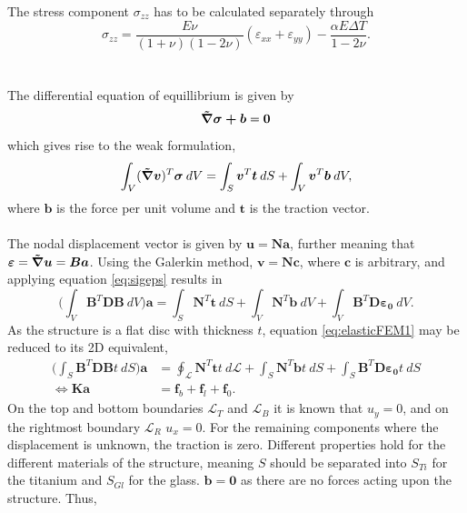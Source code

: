 \documentclass[a4paper,11pt]{article}
\begin{document}
The stress component $\sigma_{zz}$ has to be calculated separately through
\begin{equation} \label{eq:sigmazz}
    \sigma_{zz}=\frac{E \nu}{(1+\nu)(1-2\nu)}(\varepsilon_{xx}+ \varepsilon_{yy}) - \frac{\alpha E \Delta T}{1-2\nu}.
\end{equation}
\\
\\The differential equation of equillibrium is given by
\begin{equation}
    \boldsymbol{\Tilde{\nabla}\sigma + b} = \boldsymbol 0
\end{equation}
which gives rise to the weak formulation,
\begin{equation}
    \int_V (\boldsymbol{\Tilde{\nabla}v})^T \boldsymbol{\sigma} \: dV = \int_S \boldsymbol{v}^T\boldsymbol{t} \: dS + \int_V \boldsymbol{v}^T\boldsymbol{b} \: dV,
\end{equation}
where $\boldsymbol{b}$ is the force per unit volume and $\boldsymbol{t}$ is the traction vector.\\
\\The nodal displacement vector is given by $\boldsymbol{u} = \boldsymbol{Na}$, further meaning that $\boldsymbol{\varepsilon} = \boldsymbol{\Tilde{\nabla} u} = \boldsymbol{Ba}$. Using the Galerkin method, $\boldsymbol{v} = \boldsymbol{Nc}$, where $\boldsymbol{c}$ is arbitrary, and applying equation \ref{eq:sigeps} results in
\begin{equation} \label{eq:elasticFEM1}
    \bigg( \int_V \boldsymbol{B}^T\boldsymbol{DB} \: dV \bigg) \boldsymbol{a} = \int_S \boldsymbol{N}^T \boldsymbol{t} \: dS + \int_V \boldsymbol{N}^T \boldsymbol{b} \: dV + \int_V \boldsymbol{B}^T \boldsymbol{D \varepsilon_0} \: dV.
\end{equation}
As the structure is a flat disc with thickness $t$, equation \ref{eq:elasticFEM1} may be reduced to its 2D equivalent,
\begin{align}
    \bigg( \int_S \boldsymbol{B}^T\boldsymbol{DB} t \: dS \bigg) \boldsymbol{a} &= \oint_{\mathcal{L}} \boldsymbol{N}^T \boldsymbol{t} t \: d\mathcal{L} + \int_S \boldsymbol{N}^T \boldsymbol{b} t \: dS + \int_S \boldsymbol{B}^T \boldsymbol{D \varepsilon_0} t \: dS\\
    \iff \boldsymbol{Ka} &= \boldsymbol{f}_b + \boldsymbol{f}_l + \boldsymbol{f}_0. \label{eq:mechanicalFEM}
\end{align}
On the top and bottom boundaries $\mathcal{L}_T$ and $\mathcal{L}_B$ it is known that $u_y = 0$, and on the rightmost boundary $\mathcal{L}_R$ $u_x=0$. For the remaining components where the displacement is unknown, the traction is zero. Different properties hold for the different materials of the structure, meaning $S$ should be separated into $S_{Ti}$ for the titanium and $S_{Gl}$ for the glass. $\boldsymbol{b}=\boldsymbol{0}$ as there are no forces acting upon the structure. Thus,
\end{document}
